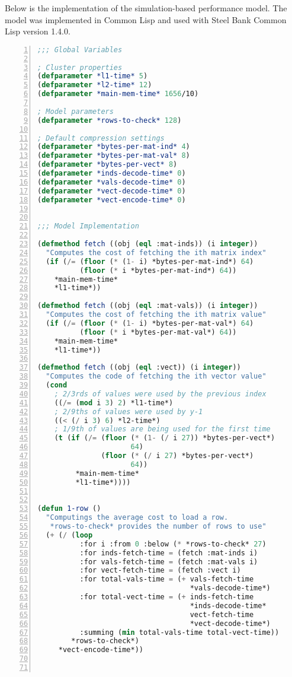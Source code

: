 Below is the implementation of the simulation-based performance model.
The model was implemented in Common Lisp and used with Steel Bank Common Lisp version 1.4.0.

\begin{lstlisting}[language=Lisp,
					showstringspaces=false,
					numbers=left,
					numberstyle=\tiny]
;;; Global Variables

; Cluster properties
(defparameter *l1-time* 5)
(defparameter *l2-time* 12)
(defparameter *main-mem-time* 1656/10)

; Model parameters
(defparameter *rows-to-check* 128)

; Default compression settings
(defparameter *bytes-per-mat-ind* 4)
(defparameter *bytes-per-mat-val* 8)
(defparameter *bytes-per-vect* 8)
(defparameter *inds-decode-time* 0)
(defparameter *vals-decode-time* 0)
(defparameter *vect-decode-time* 0)
(defparameter *vect-encode-time* 0)


;;; Model Implementation

(defmethod fetch ((obj (eql :mat-inds)) (i integer))
  "Computes the cost of fetching the ith matrix index"
  (if (/= (floor (* (1- i) *bytes-per-mat-ind*) 64)
          (floor (* i *bytes-per-mat-ind*) 64))
    *main-mem-time*
    *l1-time*))

(defmethod fetch ((obj (eql :mat-vals)) (i integer))
  "Computes the cost of fetching the ith matrix value"
  (if (/= (floor (* (1- i) *bytes-per-mat-val*) 64)
          (floor (* i *bytes-per-mat-val*) 64))
    *main-mem-time*
    *l1-time*))

(defmethod fetch ((obj (eql :vect)) (i integer))
  "Computes the code of fetching the ith vector value"
  (cond
    ; 2/3rds of values were used by the previous index
    ((/= (mod i 3) 2) *l1-time*)
    ; 2/9ths of values were used by y-1
    ((< (/ i 3) 6) *l2-time*)
    ; 1/9th of values are being used for the first time
    (t (if (/= (floor (* (1- (/ i 27)) *bytes-per-vect*)
                      64)
               (floor (* (/ i 27) *bytes-per-vect*)
                      64))
         *main-mem-time*
         *l1-time*))))


(defun 1-row ()
  "Computings the average cost to load a row.
   *rows-to-check* provides the number of rows to use"
  (+ (/ (loop
          :for i :from 0 :below (* *rows-to-check* 27)
          :for inds-fetch-time = (fetch :mat-inds i)
          :for vals-fetch-time = (fetch :mat-vals i)
          :for vect-fetch-time = (fetch :vect i)
          :for total-vals-time = (+ vals-fetch-time
                                    *vals-decode-time*)
          :for total-vect-time = (+ inds-fetch-time
                                    *inds-decode-time*
                                    vect-fetch-time
                                    *vect-decode-time*)
          :summing (min total-vals-time total-vect-time))
        *rows-to-check*)
     *vect-encode-time*))



\end{lstlisting}
